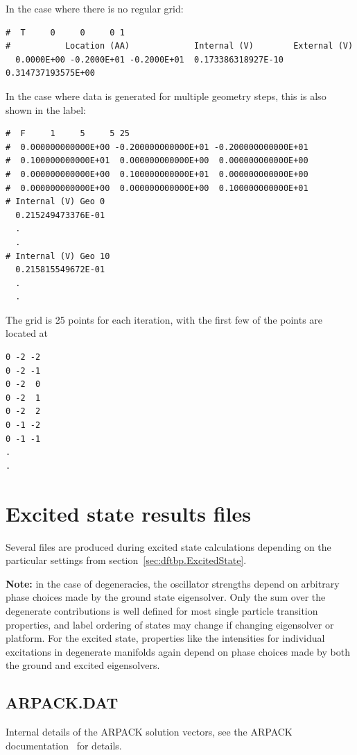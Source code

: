 In the case where there is no regular grid:
\begin{verbatim}
#  T     0     0     0 1
#           Location (AA)             Internal (V)        External (V)
  0.0000E+00 -0.2000E+01 -0.2000E+01  0.173386318927E-10  0.314737193575E+00
\end{verbatim}

In the case where data is generated for multiple geometry steps, this is also
shown in the label:
\begin{verbatim}
#  F     1     5     5 25
#  0.000000000000E+00 -0.200000000000E+01 -0.200000000000E+01
#  0.100000000000E+01  0.000000000000E+00  0.000000000000E+00
#  0.000000000000E+00  0.100000000000E+01  0.000000000000E+00
#  0.000000000000E+00  0.000000000000E+00  0.100000000000E+01
# Internal (V) Geo 0
  0.215249473376E-01
  .
  .
# Internal (V) Geo 10
  0.215815549672E-01
  .
  .
\end{verbatim}
The grid is 25 points for each iteration, with the first few of the
points are located at
\begin{verbatim}
0 -2 -2
0 -2 -1
0 -2  0
0 -2  1
0 -2  2
0 -1 -2
0 -1 -1
.
.
\end{verbatim}

\section{Excited state results files}
\label{sec:tddftb_lr}
Several files are produced during excited state calculations depending on the
particular settings from section~\ref{sec:dftbp.ExcitedState}.

\textbf{Note:} in the case of degeneracies, the oscillator strengths depend on
arbitrary phase choices made by the ground state eigensolver. Only the sum over
the degenerate contributions is well defined for most single particle transition
properties, and label ordering of states may change if changing eigensolver or
platform. For the excited state, properties like the intensities for
individual excitations in degenerate manifolds again depend on phase choices
made by both the ground and excited eigensolvers.


\subsection{ARPACK.DAT}

Internal details of the ARPACK solution vectors, see the ARPACK
documentation~\cite{Lehoucq97arpackusers} for details.

